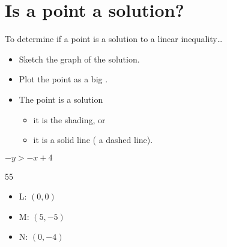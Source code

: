 \section{Is a point a solution?}

\begin{myConcept}{To determine if a point is a solution to a linear inequality\dots}
  \begin{itemize}[fullwidth]
    \item Sketch the graph of the solution.
    \item Plot the point as a big .
    \item The point {is} a solution 
    \begin{itemize}
      \item it is  the shading, or 
      \item it is  a solid line (  a dashed line).
    \end{itemize}
  \end{itemize}
\end{myConcept}



  {
    $-y > -x+4$\\[4\onelineskip]
    \begin{minipage}{0.62\textwidth}
      \begin{myTikzpictureGrid}{0.5} {5}{5}
      \end{myTikzpictureGrid}
    \end{minipage}
    \begin{minipage}{0.36\textwidth}
      \begin{itemize}
        \item L: $(0,0)$
        \item M: $(5,-5)$
        \item N: $(0,-4)$
      \end{itemize}
    \end{minipage}
  }
    